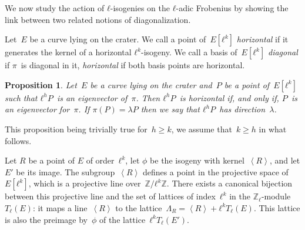\documentclass{lms}
\newtheorem{prop}[thm]{Proposition}
\def\chev#1{\left\langle#1\right\rangle}
\begin{document}
We now study the action of $ℓ$-isogenies on the $ℓ$-adic Frobenius by
showing the link between two related notions of diagonalization.

\begin{defi}
  Let~$E$ be a curve lying on the crater. We call a point of~$E[ℓ^k]$
  \emph{horizontal} if it generates the kernel of a horizontal
  $ℓ^k$-isogeny.  We call a basis of~$E[ℓ^k]$ \emph{diagonal} if
  $π$~is diagonal in it, \emph{horizontal} if both basis points are
  horizontal.
\end{defi}

\begin{prop} \label{prop:diagonal-horizontal}
Let~$E$ be a curve lying on the crater and~$P$ be a point of~$E[ℓ^k]$
such that $ℓ^h P$~is an eigenvector of~$π$.
Then $ℓ^h P$~is horizontal if, and only if, $P$~is an eigenvector for~$π$.
If $π(P) = λ P$ then we say that $ℓ^h P$~has direction~$λ$.
\end{prop}

This proposition being trivially true for~$h ≥ k$,
we assume that~$k ≥ h$ in what follows.

Let $R$ be a point of $E$ of order~$ℓ^k$, let $ϕ$ be the isogeny 
with kernel~$\chev{R}$, and let $E'$ be its image. The subgroup~$\chev{R}$ defines a point in
the projective space of~$E[ℓ^k]$,
which is a projective line over~$ℤ/ℓ^k ℤ$.
There exists a canonical bijection~\cite[II.1.1]{SL2} between
this projective line and
the set of lattices of index~$ℓ^k$ in the $ℤ_ℓ$-module $T_ℓ(E)$:
it maps a line~$\chev{R}$ to the lattice~$Λ_R = \chev{R} + ℓ^k T_ℓ(E)$.
This lattice is also the preimage by~$ϕ$
of the lattice~$ℓ^k T_ℓ(E')$.
\end{document}
